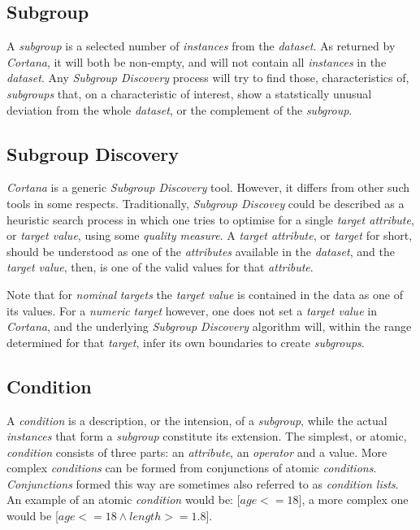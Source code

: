 \documentclass{article}
\begin{document}
\subsection{Subgroup}
\label{preliminaries:subgroup}
A \emph{subgroup} is a selected number of \emph{instances} from the \emph{dataset}.
As returned by \emph{Cortana}, it will both be non-empty, and will not contain all \emph{instances} in the \emph{dataset}.
Any \emph{Subgroup Discovery} process will try to find those, characteristics of, \emph{subgroups} that, on a characteristic of interest, show a statstically unusual deviation from the whole \emph{dataset}, or the complement of the \emph{subgroup}.



\subsection{Subgroup Discovery}
\label{preliminaties:subgroup-discovery}
\emph{Cortana} is a generic \emph{Subgroup Discovery} tool.
However, it differs from other such tools in some respects.
Traditionally, \emph{Subgroup Discovey} could be described as a heuristic search process in which one tries to optimise for a single \emph{target attribute}, or \emph{target value}, using some \emph{quality measure}.
A \emph{target attribute}, or \emph{target} for short, should be understood as one of the \emph{attributes} available in the \emph{dataset}, and the \emph{target value}, then, is one of the valid values for that \emph{attribute}.

Note that for \emph{nominal} \emph{targets} the \emph{target value} is contained in the data as one of its values.
For a \emph{numeric} \emph{target} however, one does not set a \emph{target value} in \emph{Cortana}, and the underlying \emph{Subgroup Discovery} algorithm will, within the range determined for that \emph{target}, infer its own boundaries to create \emph{subgroups}.



\subsection{Condition}
\label{preliminaries:condition}
A \emph{condition} is a description, or the intension, of a \emph{subgroup}, while the actual \emph{instances} that form a \emph{subgroup} constitute its extension.
The simplest, or atomic, \emph{condition} consists of three parts: an \emph{attribute}, an \emph{operator} and a value.
More complex \emph{conditions} can be formed from conjunctions of atomic \emph{conditions}.
\emph{Conjunctions} formed this way are sometimes also referred to as \emph{condition lists}.
An example of an atomic \emph{condition} would be: \mbox{[$age <= 18$]}, a more complex one would be \mbox{[$age <= 18 \wedge length >= 1.8$]}.
\end{document}
